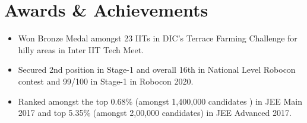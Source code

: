 \documentclass[a4paper,10pt]{article}
\newcommand{\customHeading}[1]{
    \section{\texorpdfstring{#1 \hrulefill}{}}
}
\begin{document}
\customHeading{Awards \& Achievements}
\begin{minipage}[t]{\linewidth}
    \begin{itemize}[nosep,after=\strut, leftmargin=1em, itemsep=3pt]
        \item Won Bronze Medal amongst 23 IITs in DIC’s Terrace Farming Challenge for hilly areas in Inter IIT Tech Meet.
        \item Secured 2nd position in Stage-1 and overall 16th in National Level Robocon contest and 99/100 in Stage-1 in Robocon 2020.
        \item  Ranked amongst the top 0.68\% (amongst 1,400,000 candidates ) in JEE Main 2017 and top 5.35\% (amongst 2,00,000 candidates) in JEE Advanced 2017.
    \end{itemize}
\end{minipage}





\vfill
{}
\end{document}
